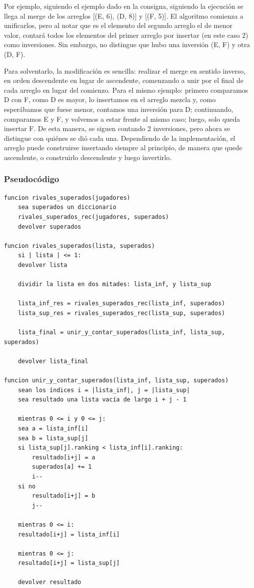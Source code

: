 \documentclass[titlepage,a4paper]{article}
\begin{document}
Por ejemplo, siguiendo el ejemplo dado en la consigna, siguiendo la ejecución se llega al merge de los arreglos [(E, 6), (D, 8)] y [(F, 5)]. El algoritmo comienza a unificarlos, pero al notar que es el elemento del segundo arreglo el de menor valor, contará todos los elementos del primer arreglo por insertar (en este caso 2) como inversiones. Sin embargo, no distingue que hubo una inversión (E, F) y otra (D, F).

Para solventarlo, la modificación es sencilla: realizar el merge en sentido inverso, en orden descendente en lugar de ascendente, comenzando a unir por el final de cada arreglo en lugar del comienzo. Para el mismo ejemplo: primero comparamos D con F, como D es mayor, lo insertamos en el arreglo mezcla y, como esperábamos que fuese menor, contamos una inversión para D; continuando, comparamos E y F, y volvemos a estar frente al mismo caso; luego, solo queda insertar F. De esta manera, se siguen contando 2 inversiones, pero ahora se distingue con quiénes se dió cada una. Dependiendo de la implementación, el arreglo puede construirse insertando siempre al principio, de manera que quede ascendente, o construirlo descendente y luego invertirlo.

\subsubsection{Pseudocódigo}
\label{sec:org4f16b01}

\begin{verbatim}
funcion rivales_superados(jugadores)
    sea superados un diccionario
    rivales_superados_rec(jugadores, superados)
    devolver superados

funcion rivales_superados(lista, superados)
    si | lista | <= 1:
	devolver lista

    dividir la lista en dos mitades: lista_inf, y lista_sup

    lista_inf_res = rivales_superados_rec(lista_inf, superados)
    lista_sup_res = rivales_superados_rec(lista_sup, superados)

    lista_final = unir_y_contar_superados(lista_inf, lista_sup, superados)

    devolver lista_final

funcion unir_y_contar_superados(lista_inf, lista_sup, superados)
    sean los índices i = |lista_inf|, j = |lista_sup|
    sea resultado una lista vacía de largo i + j - 1

    mientras 0 <= i y 0 <= j:
	sea a = lista_inf[i]
	sea b = lista_sup[j]
	si lista_sup[j].ranking < lista_inf[i].ranking:
	    resultado[i+j] = a
	    superados[a] += 1
	    i--
	si no
	    resultado[i+j] = b
	    j--

    mientras 0 <= i:
	resultado[i+j] = lista_inf[i]

    mientras 0 <= j:
	resultado[i+j] = lista_sup[j]

    devolver resultado
\end{verbatim}
\end{document}

